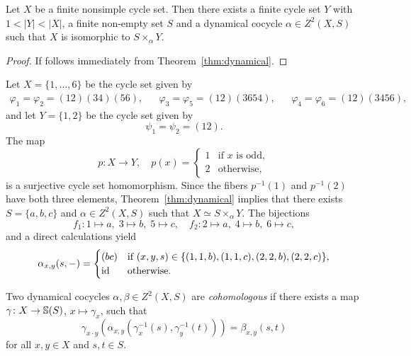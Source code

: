 \begin{corollary}
	Let $X$ be a finite nonsimple cycle set.  Then there exists a finite cycle
	set $Y$ with $1<|Y|<|X|$, a finite non-empty set $S$ and a dynamical
	cocycle $\alpha\in Z^2(X,S)$ such that $X$ is isomorphic to $S\times_\alpha
	Y$.
\end{corollary}

\begin{proof}
	If follows immediately from Theorem~\ref{thm:dynamical}.
\end{proof}

\begin{example}
	Let $X=\{1,\dots,6\}$ be the cycle set given by
	\begin{align*}
		\varphi_1=\varphi_2=(12)(34)(56),&&
		\varphi_3=\varphi_5=(12)(3654),&&
		\varphi_4=\varphi_6=(12)(3456),
	\end{align*}
	and let $Y=\{1,2\}$ be the cycle set given by
	\[
		\psi_1=\psi_2=(12).
	\]
	The map 
	\[
	p\colon X\to Y,\quad
	p(x)=\begin{cases}
		1 & \text{if $x$ is odd},\\
		2 & \text{otherwise},
	\end{cases}
	\]
	is a surjective cycle set homomorphism. Since the fibers $p^{-1}(1)$ and $p^{-1}(2)$
	have both three elements, Theorem~\ref{thm:dynamical} implies that there
	exists $S=\{a,b,c\}$ and $\alpha\in Z^2(X,S)$ such
	that $X\simeq S\times_\alpha Y$. The bijections
	\[
		f_1\colon 1\mapsto a,\;3\mapsto b,\;5\mapsto c,
		\quad
		f_2\colon 2\mapsto a,\;4\mapsto b,\;6\mapsto c,
	\]
	and a direct calculations yield
	\[
		\alpha_{x,y}(s,-)=\begin{cases}
			(bc) & \text{if $(x,y,s)\in\{(1,1,b),(1,1,c),(2,2,b),(2,2,c)\}$},\\
			\operatorname{id} & \text{otherwise}.
		\end{cases}
	\]
\end{example}

\begin{definition}
	Two dynamical cocycles $\alpha,\beta\in Z^2(X,S)$ are \emph{cohomologous} if
	there exists a map $\gamma\colon X\to\mathbb{S}(S)$, $x\mapsto\gamma_x$, such that
	\begin{equation}
		\label{eq:cohomologous}
		\gamma_{x\cdot y}\left(\alpha_{x,y}(\gamma^{-1}_x(s),\gamma^{-1}_{y}(t))\right)
		=\beta_{x,y}(s,t)
	\end{equation}
	for all $x,y\in X$ and $s,t\in S$. 
\end{definition}

